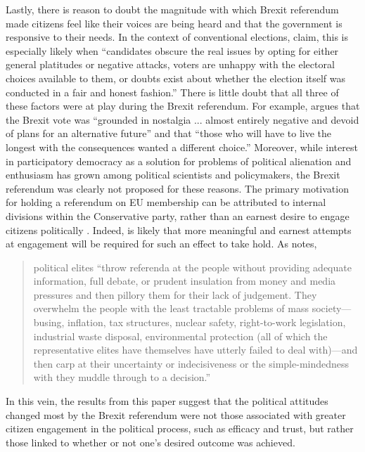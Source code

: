 \documentclass[12pt, letter]{article}
\begin{document}
Lastly, there is reason to doubt the magnitude with which Brexit referendum made citizens feel like their voices are being heard and that the government is responsive to their needs. In the context of conventional elections, \textcite[579]{craig2006winners} claim, this is especially likely when “candidates obscure the real issues by opting for either general platitudes or negative attacks, voters are unhappy with the electoral choices available to them, or doubts exist about whether the election itself was conducted in a fair and honest fashion.” There is little doubt that all three of these factors were at play during the Brexit referendum. For example, \textcite[50]{calhoun2016brexit} argues that the Brexit vote was ``grounded in nostalgia ... almost entirely negative and devoid of plans for an alternative future'' and that ``those who will have to live the longest with the consequences wanted a different choice.'' Moreover, while interest in participatory democracy as a solution for problems of political alienation and enthusiasm has grown among political scientists and policymakers, the Brexit referendum was clearly not proposed for these reasons. The primary motivation for holding a referendum on EU membership can be attributed to internal divisions within the Conservative party, rather than an earnest desire to engage citizens politically \parencite{hobolt2016public, moore2017policy, prosser2016calling}. Indeed, is likely that more meaningful and earnest attempts at engagement will be required for such an effect to take hold. As \textcite[154]{barber2003strong} notes,

\begin{quote}
political elites ``throw referenda at the people without providing adequate information, full debate, or prudent insulation from money and media pressures and then pillory them for their lack of judgement. They overwhelm the people with the least tractable problems of mass society---busing, inflation, tax structures, nuclear safety, right-to-work legislation, industrial waste disposal, environmental protection (all of which the representative elites have themselves have utterly failed to deal with)---and then carp at their uncertainty or indecisiveness or the simple-mindedness with they muddle through to a decision.'' 
\end{quote}

In this vein, the results from this paper suggest that the political attitudes changed most by the Brexit referendum were not those associated with greater citizen engagement in the political process, such as efficacy and trust, but rather those linked to whether or not one's desired outcome was achieved. 
\end{document}
